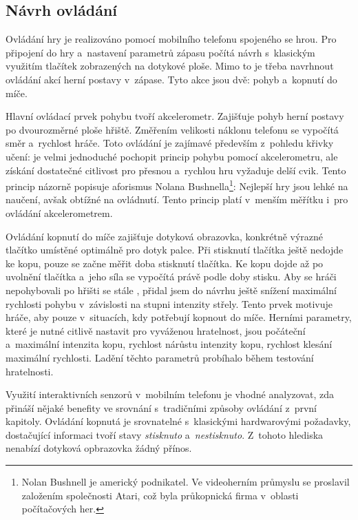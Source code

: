\documentclass[thesis=B,czech,hidelinks]{FITthesis}[2012/06/26] %
\begin{document}
\subsection{Návrh ovládání}

Ovládání hry je realizováno pomocí mobilního telefonu spojeného se hrou. Pro připojení do hry a~nastavení parametrů zápasu počítá návrh s~klasickým využitím tlačítek zobrazených na dotykové ploše. Mimo to je třeba navrhnout ovládání akcí herní postavy v~zápase. Tyto akce jsou dvě: pohyb a~kopnutí do míče.

Hlavní ovládací prvek pohybu tvoří akcelerometr. Zajišťuje pohyb herní postavy po dvourozměrné ploše hřiště. Změřením velikosti náklonu telefonu se vypočítá směr a~rychlost hráče. Toto ovládání je zajímavé především z~pohledu křivky učení: je velmi jednoduché pochopit princip pohybu pomocí akcelerometru, ale získání dostatečné citlivost pro přesnou a~rychlou hru vyžaduje delší cvik. Tento princip názorně popisuje aforismus Nolana Bushnella\footnote{Nolan Bushnell je americký podnikatel. Ve videoherním průmyslu se proslavil založením společnosti Atari, což byla průkopnická firma v~oblasti počítačových her.\cite{atari}}: Nejlepší hry jsou lehké na naučení, avšak obtížné na ovládnutí. \cite{atari} Tento princip platí v~menším měřítku i~pro ovládání akcelerometrem.

Ovládání kopnutí do míče zajišťuje dotyková obrazovka, konkrétně výrazné tlačítko umístěné optimálně pro dotyk palce. Při stisknutí tlačítka ještě nedojde ke kopu, pouze se začne měřit doba stisknutí tlačítka. Ke kopu dojde až po uvolnění tlačítka a~jeho síla se vypočítá právě podle doby stisku. Aby se hráči nepohybovali po hřišti se stále , přidal jsem do návrhu ještě snížení maximální rychlosti pohybu v~závislosti na stupni intenzity střely. Tento prvek motivuje hráče, aby  pouze v~situacích, kdy potřebují kopnout do míče. Herními parametry, které je nutné citlivě nastavit pro vyváženou hratelnost, jsou počáteční a~maximální intenzita kopu, rychlost nárůstu intenzity kopu, rychlost klesání maximální rychlosti. Ladění těchto parametrů probíhalo během testování hratelnosti.

Využití interaktivních senzorů v~mobilním telefonu je vhodné analyzovat, zda přináší nějaké benefity ve srovnání s~tradičními způsoby ovládání z~první kapitoly. Ovládání kopnutá je srovnatelné s~klasickými hardwarovými požadavky, dostačující informaci tvoří stavy \textit{stisknuto} a~\textit{nestisknuto}. Z~tohoto hlediska nenabízí dotyková opbrazovka žádný přínos.
\end{document}
